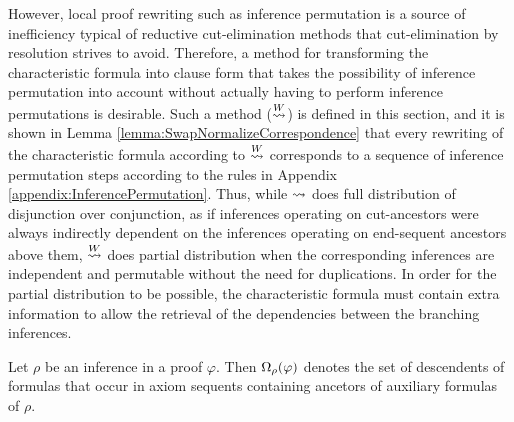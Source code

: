 \documentclass{llncs}
\begin{document}
\noindent
However, local proof rewriting such as inference permutation is a source of inefficiency typical of reductive cut-elimination methods that cut-elimination by resolution strives to avoid. Therefore, a method for transforming the characteristic formula into clause form that takes the possibility of inference permutation into account without actually having to perform inference permutations is desirable. Such a method ($\stackrel{W}{\leadsto}$) is defined in this section, and it is shown in Lemma \ref{lemma:SwapNormalizeCorrespondence} that every rewriting of the characteristic formula according to $\stackrel{W}{\leadsto}$ corresponds to a sequence of inference permutation steps according to the rules in Appendix \ref{appendix:InferencePermutation}. Thus, while $\leadsto$ does full distribution of disjunction over conjunction, as if inferences operating on cut-ancestors were always indirectly dependent on the inferences operating on end-sequent ancestors above them, $\stackrel{W}{\leadsto}$ does partial distribution when the corresponding inferences are independent and permutable without the need for duplications. In order for the partial distribution to be possible, the characteristic formula must contain extra information to allow the retrieval of the dependencies between the branching inferences.



\begin{definition}
\label{definition:InferenceOccurrences}
Let $\rho$ be an inference in a proof $\varphi$. Then
$
\Omega_{\rho}(\varphi)
$
denotes the set of descendents of formulas that occur in axiom sequents containing ancetors of auxiliary formulas of $\rho$.
\end{definition}


\newcommand{\marked}[1]{#1^*}
\end{document}
